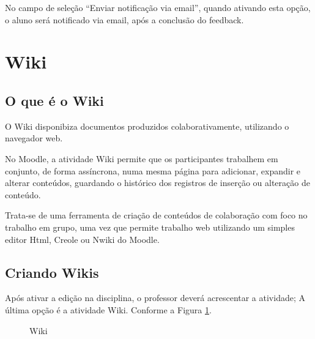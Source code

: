 No campo de seleção “Enviar notificação via email”, quando ativando esta opção, o aluno será notificado via email, após a conclusão do feedback.

\section{Wiki}
\subsection{O que é o Wiki}
O Wiki disponibiza documentos produzidos colaborativamente, utilizando  o navegador web.

No Moodle, a atividade Wiki  permite que  os participantes  trabalhem em conjunto, de forma assíncrona, numa mesma página para adicionar, expandir e alterar conteúdos, guardando o histórico dos registros de inserção ou alteração de conteúdo.

Trata-se de uma ferramenta de criação de conteúdos de colaboração com foco no trabalho em grupo, uma vez que permite trabalho web utilizando um simples  editor Html, Creole ou Nwiki  do Moodle.

\subsection{Criando Wikis}
Após ativar a edição na disciplina, o professor deverá acrescentar a atividade; A última opção é a atividade Wiki. Conforme a Figura \ref{fig:cap5_43}.
\begin{figure}[!htbp]
 \begin{center}
\caption{Wiki}
  \label{fig:cap5_43}
 \end{center}
\end{figure}

